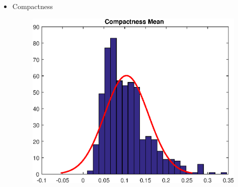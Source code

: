 \documentclass[11pt,a4paper]{article}
\numberwithin{equation}{section}
\begin{document}
\begin{itemize}
\item Compactness
\begin{figure}[H]
\centering
  \includegraphics[width=.5\linewidth]{./img/compactness_mean}
  \label{fig:test1}
\end{figure}%


\end{itemize}
\end{document}
